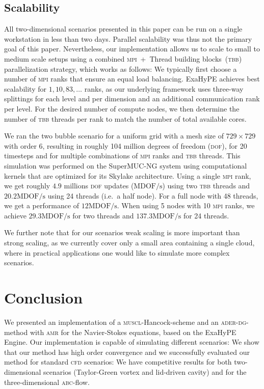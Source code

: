 \documentclass[runningheads]{llncs}
\newcommand{\muscl}{\textsc{muscl}-Hancock}
\newcommand{\aderdg}{\textsc{ader-dg}}
\newcommand{\amr}{\textsc{amr}}
\newcommand{\tbb}{\textsc{tbb}}
\newcommand{\mpi}{\textsc{mpi}}
\newcommand{\softwareName}[1]{#1}
\newcommand{\exahype}{\softwareName{ExaHyPE}}
\newcommand{\exahypeengine}{\softwareName{ExaHyPE Engine}}
\begin{document}
\subsection{Scalability}%
\newcommand{\mdofs}{\text{MDOF/s}}%
All two-dimensional scenarios presented in this paper can be run on a single workstation in less than two days.
Parallel scalability was thus not the primary goal of this paper.
Nevertheless, our implementation allows us to scale to small to medium scale setups using a combined \mpi{}~+~Thread building blocks~(\tbb{}) parallelization strategy, which works as follows:
We typically first choose a number of \mpi{} ranks that ensure an equal load balancing.
\exahype{} achieves best scalability for $1, 10, 83, \ldots$ ranks, as our underlying framework uses three-way splittings for each level and per dimension and an additional communication rank per level.
For the desired number of compute nodes, we then determine the number of \tbb{} threads per rank to match the number of total available cores.

We ran the two bubble scenario for a uniform grid with a mesh size of $729 \times 729$ with order 6, resulting in roughly 104 million degrees of freedom (\textsc{dof}), for 20 timesteps and for multiple combinations of \mpi{} ranks and \tbb{} threads.
This simulation was performed on the SuperMUC-NG system using computational kernels that are optimized for its Skylake architecture.
Using a single \mpi{} rank, we get roughly $4.9$ millions \textsc{dof} updates ($\mdofs$) using two \tbb{} threads and $20.2 \mdofs$ using 24 threads (i.e.\ a half node).
For a full node with 48 threads, we get a performance of $12 \mdofs$.
When using 5 nodes with 10 \mpi{} ranks, we achieve $29.3 \mdofs$ for two threads and $137.3 \mdofs$ for 24 threads.

We further note that for our scenarios weak scaling is more important than strong scaling, as we currently cover only a small area containing a single cloud, where in practical applications one would like to simulate more complex scenarios.
\section{Conclusion}
We presented an implementation of a \muscl{}-scheme and an \aderdg{}-method with \amr{} for the Navier-Stokes equations, based on the \exahypeengine.
Our implementation is capable of simulating different scenarios:
We show that our method has high order convergence and we successfully evaluated our method for standard \textsc{cfd} scenarios:
We have competitive results for both two-dimensional scenarios (Taylor-Green vortex and lid-driven cavity) and for the three-dimensional \textsc{abc}-flow.
\end{document}
